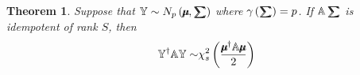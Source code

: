 \documentclass{article}
\newtheorem{theorem}{Theorem}
\begin{document}
\bigskip

\begin{theorem}
Suppose that $\mathbb{Y}\sim N_{p}\left( \mathbb{%
\mu\mkern-12.3mu\mu%
},\mathbb{%
\tsum\mkern-20mu\tsum%
}\right) $ where $\gamma \left( \mathbb{%
\tsum\mkern-20mu\tsum%
}\right) =p$. If $\mathbb{A%
\tsum\mkern-20mu\tsum%
}$ is idempotent of rank $S$, then 
\begin{equation*}
\mathbb{Y}^{\mathbb{\dagger }}\mathbb{AY\sim }\chi _{s}^{2}\left( \frac{%
\mathbb{%
\mu\mkern-12.3mu\mu%
}^{\dagger }\mathbb{A%
\mu\mkern-12.3mu\mu%
}}{2}\right)
\end{equation*}


\end{theorem}
\end{document}
